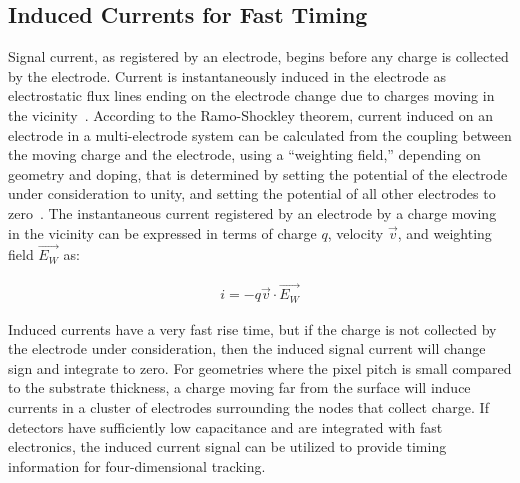 \begin{refsection}
\section{Induced Currents for Fast Timing}
Signal current, as registered by an electrode, begins before any charge is collected by the electrode.  
Current is instantaneously induced in the electrode as electrostatic flux lines ending on the electrode change due to charges moving in the vicinity~\cite{doi:10.1063/1.1710367}.
According to the Ramo-Shockley theorem, current induced on an electrode in a multi-electrode system can be calculated from the coupling between the moving charge and the electrode, using a ``weighting field,'' depending on geometry and doping, that is determined by setting the potential of the electrode under consideration to unity, and setting the potential of all other electrodes to zero~\cite{1686997}.
The instantaneous current registered by an electrode by a charge moving in the vicinity can be expressed in terms of charge $q$, velocity $\vec{v}$, and weighting field $\vec{E_W}$ as:
\begin{linenomath*}
\begin{align}
i = -q \vec{v} \cdot \vec{E_W}
\end{align}
\end{linenomath*}
Induced currents have a very fast rise time, but if the charge is not collected by the electrode under consideration, then the induced signal current will change sign and integrate to zero.
For geometries where the pixel pitch is small compared to the substrate thickness, a charge moving far from the surface will induce currents in a cluster of electrodes surrounding the nodes that collect charge.
If detectors have sufficiently low capacitance and are integrated with fast electronics, the induced current signal can be utilized to provide timing information for four-dimensional tracking.


\end{refsection}
